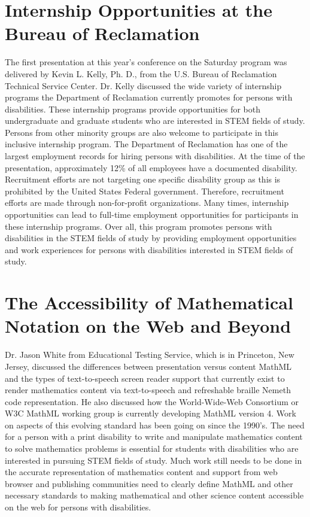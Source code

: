 \documentclass[11.5pt]{sig-alternate} %
\begin{document}
\begin{large}
\section*{Internship Opportunities at the Bureau of Reclamation}
The first presentation at this year’s conference on the Saturday program was delivered by Kevin L. Kelly, Ph. D., from the U.S. Bureau of Reclamation Technical Service Center. Dr. Kelly discussed the wide variety of internship programs the Department of Reclamation currently promotes for persons with disabilities. These internship programs provide opportunities for both undergraduate and graduate students who are interested in STEM fields of study. Persons from other minority groups are also welcome to participate in this inclusive internship program. The Department of Reclamation has one of the largest employment records for hiring persons with disabilities. At the time of the presentation, approximately 12\% of all employees have a documented disability. Recruitment efforts are not targeting one specific disability group as this is prohibited by the United States Federal government. Therefore, recruitment efforts are made through non-for-profit organizations. Many times, internship opportunities can lead to full-time employment opportunities for participants in these internship programs. Over all, this program promotes persons with disabilities in the STEM fields of study by providing employment opportunities and work experiences for persons with disabilities interested in STEM fields of study.


\section*{The Accessibility of Mathematical Notation on the Web and Beyond}
Dr. Jason White from Educational Testing Service, which is in Princeton, New Jersey, discussed the differences between presentation versus content MathML and the types of text-to-speech screen reader support that currently exist to render mathematics content via text-to-speech and refreshable braille Nemeth code representation. He also discussed how the World-Wide-Web Consortium or W3C MathML working group is currently developing MathML version 4. Work on aspects of this evolving standard has been going on since the 1990’s. The need for a person with a print disability to write and manipulate mathematics content to solve mathematics problems is essential for students with disabilities who are interested in pursuing STEM fields of study. Much work still needs to be done in the accurate representation of mathematics content and support from web browser and publishing communities need to clearly define MathML and other necessary standards to making mathematical and other science content accessible on the web for persons with disabilities.



\end{large}
\end{document}
